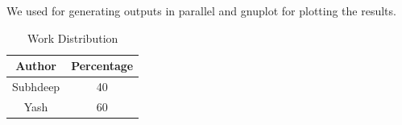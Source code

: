 \documentclass{sig-alternate}
\begin{document}
We used \cite{Tange2011a} for generating outputs in parallel and gnuplot for
plotting the results.

\begin{table}[h!]
  \centering
  \begin{tabular}{| c | c |} 
    \hline
    Author & Percentage \\ [0.5ex] 
    \hline
    Subhdeep & 40 \\ 
    Yash & 60 \\ 
    \hline
  \end{tabular}
  \caption{Work Distribution}
  \label{table-work-dist}
\end{table}




\end{document}
